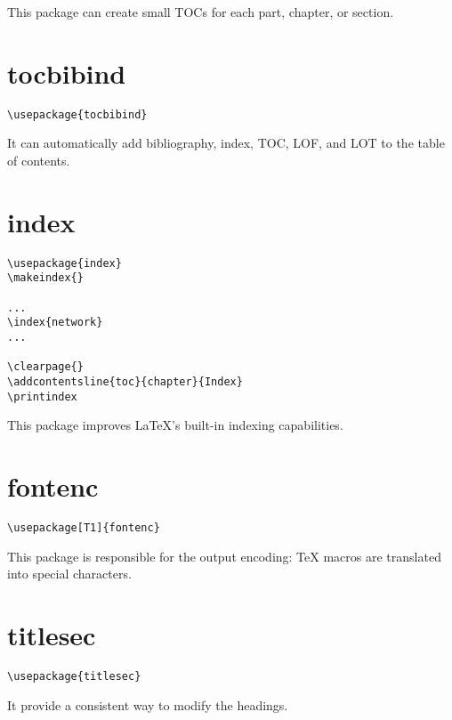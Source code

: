 This package can create small TOCs for each part, chapter, or section.


\section{tocbibind}
\label{sec:tocbibind}
\begin{lstlisting}
\usepackage{tocbibind}
\end{lstlisting}


It can automatically add bibliography, index, TOC, LOF, and LOT to the table of contents.


\section{index}
\label{sec:index}
\begin{lstlisting}
\usepackage{index}
\makeindex{}

...
\index{network}
...

\clearpage{}
\addcontentsline{toc}{chapter}{Index}
\printindex

\end{lstlisting}

This package improves LaTeX's built-in indexing capabilities.

\section{fontenc}
\label{sec:fontenc}
\begin{lstlisting}
\usepackage[T1]{fontenc}
\end{lstlisting}

This package is responsible for the output encoding: TeX macros are translated into special characters. 


\section{titlesec}
\label{sec:titlesec}
\begin{lstlisting}
\usepackage{titlesec}
\end{lstlisting}

It provide a consistent way to modify the headings.

